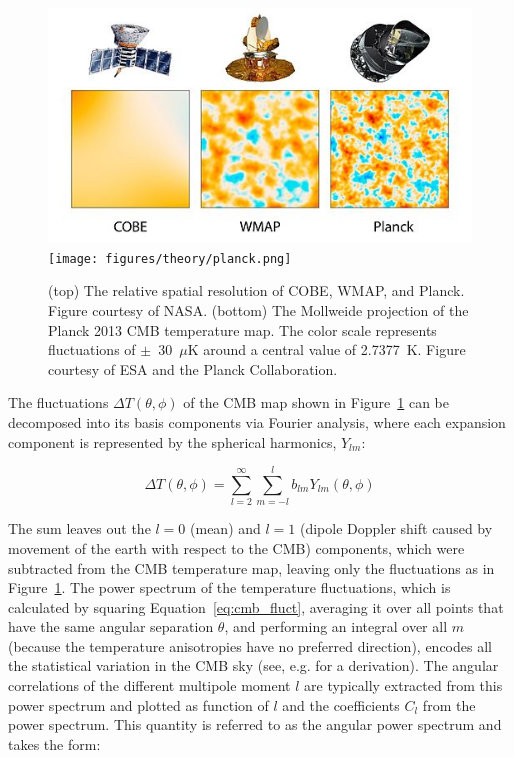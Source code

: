 \begin{figure}[htbp]
\begin{center}
\includegraphics[width=.6\textwidth]{figures/theory/satellites.jpg}
\texttt{[image: figures/theory/planck.png]}
\caption{(top) The relative spatial resolution of COBE, WMAP, and Planck. Figure courtesy of NASA. (bottom) The Mollweide projection of the Planck 2013 CMB temperature map. The color scale represents fluctuations of $\pm$~30~$\mu$K around a central value of 2.7377~K. Figure courtesy of ESA and the Planck Collaboration. }
\label{fig:cmb}
\end{center}
\end{figure}

The fluctuations $\Delta T(\theta, \phi)$ of the \ac{CMB} map shown in Figure~\ref{fig:cmb} can be decomposed into its basis components via Fourier analysis, where each expansion component is represented by the spherical harmonics, $Y_{lm}$:

\begin{equation}
\label{eq:cmb_fluct}
\Delta T(\theta, \phi) = \sum_{l=2}^{\infty} \sum_{m=-l}^{l} b_{lm} Y_{lm}(\theta, \phi)
\end{equation}

The sum leaves out the $l=0$ (mean) and $l=1$ (dipole Doppler shift caused by movement of the earth with respect to the \ac{CMB}) components, which were subtracted from the \ac{CMB} temperature map, leaving only the fluctuations as in Figure~\ref{fig:cmb}. The power spectrum of the temperature fluctuations, which is calculated by squaring Equation~\ref{eq:cmb_fluct}, averaging it over all points that have the same angular separation $\theta$, and performing an integral over all $m$ (because the temperature anisotropies have no preferred direction), encodes all the statistical variation in the \ac{CMB} sky (see, e.g. \cite{Hu2008} for a derivation). The angular correlations of the different multipole moment $l$ are typically extracted from this power spectrum and plotted as function of $l$ and the coefficients $C_{l}$ from the power spectrum. This quantity is referred to as the angular power spectrum and takes the form:

